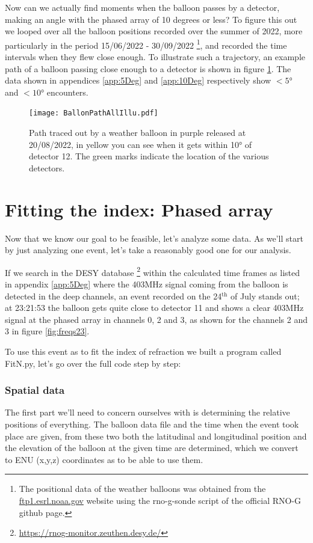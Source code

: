Now can we actually find moments when the balloon passes by a detector, making
an angle with the phased array of 10 degrees or less?  To figure this out we
looped over all the balloon positions recorded over the summer of 2022, more
particularly in the period 15/06/2022 - 30/09/2022 \footnote{The positional
data of the weather balloons was obtained from the \url{ftp1.esrl.noaa.gov}
website using the rno-g-sonde script of the official RNO-G github page.}, and
recorded the time intervals when they flew close enough.  To illustrate such a
trajectory, an example path of a balloon passing close enough to a detector is
shown in figure \ref{fig:ExampleBalloonPathCrossing12}.  The data shown in
appendices \ref{app:5Deg} and \ref{app:10Deg} respectively show $<5$° and
$<10$° encounters.
\newpage
\begin{figure}
  \centering
	\texttt{[image: BallonPathAllIllu.pdf]}
  \caption{Path traced out by a weather balloon in purple released at 20/08/2022, in yellow you can see when it
  gets within 10° of detector 12. The green marks indicate the location of the various detectors.}
  \label{fig:ExampleBalloonPathCrossing12}
\end{figure}
\section{Fitting the index: Phased array}
Now that we know our goal to be feasible, let's analyze some data.  As we'll
start by just analyzing one event, let's take a reasonably good one for our analysis.

If we search in the DESY database
\footnote{\url{https://rnog-monitor.zeuthen.desy.de/}} within the calculated
time frames as listed in appendix \ref{app:5Deg} where the 403MHz signal coming from the
balloon is detected in the deep channels, an event recorded on the 24$^\text{th}$ of July stands
out; at 23:21:53 the balloon gets quite close to detector 11 and shows a clear
403MHz signal at the phased array in channels 0, 2 and 3, as shown for the
channels 2 and 3 in figure \ref{fig:freqs23}.

To use this event as to fit the index of refraction we built a program called FitN.py\cite{projects-mt}, 
let's go over the full code step by step:
\subsubsection{Spatial data}
The first part we'll need to concern ourselves with is determining the relative
positions of everything. The balloon data file and the time when the event took
place are given, from these two both the latitudinal and longitudinal position
and the elevation of the balloon at the given time are determined, which we convert
to ENU (x,y,z) coordinates as to be able to use them. 

